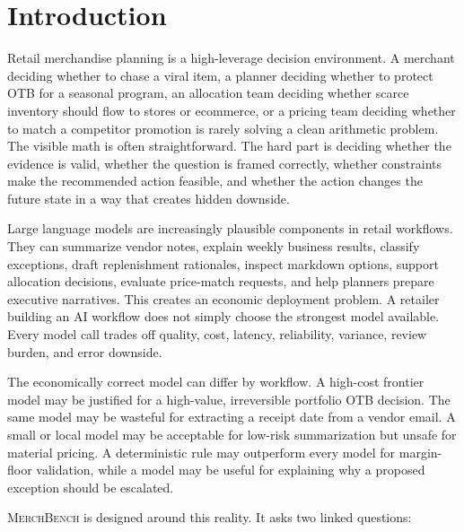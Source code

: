 \documentclass[11pt]{article}
\newcommand{\benchmark}{\textsc{MerchBench}}
\begin{document}
\begin{abstract}
The contribution of \benchmark{} is therefore not a static leaderboard. It is a reproducible structure for deciding which model, rules layer, cascade, or human-review workflow is economically right for each class of retail decision. The findings should be consumed as automated routing priors pending human-rater calibration, repeated-run variance, and production latency and retry measurement.
\end{abstract}

\section{Introduction}

Retail merchandise planning is a high-leverage decision environment. A merchant deciding whether to chase a viral item, a planner deciding whether to protect OTB for a seasonal program, an allocation team deciding whether scarce inventory should flow to stores or ecommerce, or a pricing team deciding whether to match a competitor promotion is rarely solving a clean arithmetic problem. The visible math is often straightforward. The hard part is deciding whether the evidence is valid, whether the question is framed correctly, whether constraints make the recommended action feasible, and whether the action changes the future state in a way that creates hidden downside.

Large language models are increasingly plausible components in retail workflows. They can summarize vendor notes, explain weekly business results, classify exceptions, draft replenishment rationales, inspect markdown options, support allocation decisions, evaluate price-match requests, and help planners prepare executive narratives. This creates an economic deployment problem. A retailer building an AI workflow does not simply choose the strongest model available. Every model call trades off quality, cost, latency, reliability, variance, review burden, and error downside.

The economically correct model can differ by workflow. A high-cost frontier model may be justified for a high-value, irreversible portfolio OTB decision. The same model may be wasteful for extracting a receipt date from a vendor email. A small or local model may be acceptable for low-risk summarization but unsafe for material pricing. A deterministic rule may outperform every model for margin-floor validation, while a model may be useful for explaining why a proposed exception should be escalated.

\benchmark{} is designed around this reality. It asks two linked questions:
\end{document}
